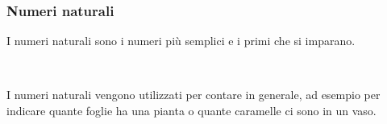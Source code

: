 \documentclass[]{beamer}
\theoremstyle{plain}
\begin{document}
\begin{frame}
\frametitle{Numeri naturali}
I numeri naturali sono i numeri più semplici e i primi che si imparano.\pause

~

\alert{I numeri naturali vengono utilizzati per contare} in generale, ad esempio per indicare quante foglie ha una pianta o quante caramelle ci sono in un vaso.

~

\end{frame}
\end{document}
